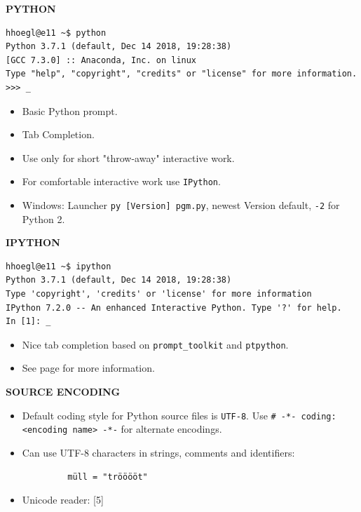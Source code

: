 \documentclass[9pt,a4wide]{extarticle}
\begin{document}
\bigskip
{\large\bf PYTHON}

\begin{verbatim}
hhoegl@e11 ~$ python
Python 3.7.1 (default, Dec 14 2018, 19:28:38) 
[GCC 7.3.0] :: Anaconda, Inc. on linux
Type "help", "copyright", "credits" or "license" for more information.
>>> _ 
\end{verbatim}

\begin{itemize}
\item Basic Python prompt.
\item Tab Completion.
\item Use only for short "throw-away" interactive work.
\item For comfortable interactive work use {\tt IPython}.
\item Windows: Launcher {\tt py [Version] pgm.py}, newest Version default, 
      {\tt -2} for Python 2.
\end{itemize}


\bigskip
{\large\bf IPYTHON}

\begin{verbatim}
hhoegl@e11 ~$ ipython
Python 3.7.1 (default, Dec 14 2018, 19:28:38) 
Type 'copyright', 'credits' or 'license' for more information
IPython 7.2.0 -- An enhanced Interactive Python. Type '?' for help.
In [1]: _
\end{verbatim}

\bigskip

\begin{itemize}

\item Nice tab completion based on {\tt prompt\_toolkit} and {\tt ptpython}.

\item See page \pageref{ipy-section} for more information.

\end{itemize}



\bigskip
{\large\bf SOURCE ENCODING}

\begin{itemize}

\item Default coding style for Python source files is {\tt UTF-8}. Use
    {\tt \# -*- coding: <encoding name> -*-} for alternate encodings.

\item Can use UTF-8 characters in strings, comments and identifiers:

\begin{verbatim}
         müll = "trööööt"    
\end{verbatim}
 
\item Unicode reader: [5] 

\end{itemize}
\end{document}
